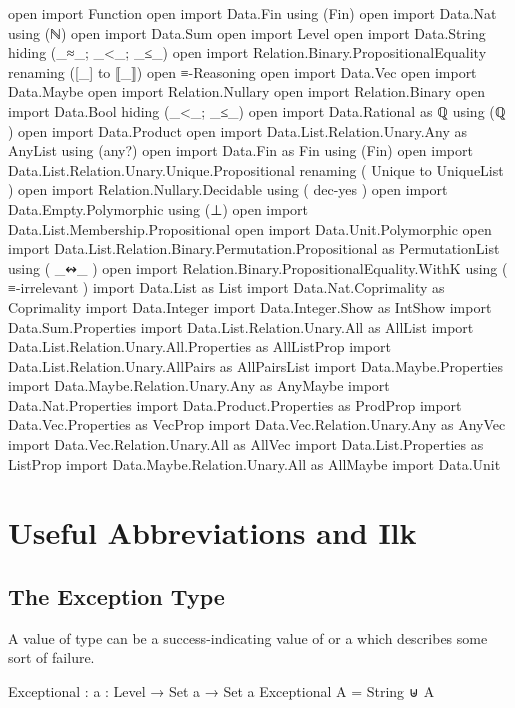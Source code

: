 \documentclass{report}
\begin{document}
\begin{code}
open import Function
open import Data.Fin using (Fin)
open import Data.Nat using (ℕ)
open import Data.Sum
open import Level
open import Data.String hiding (_≈_; _<_; _≤_)
open import Relation.Binary.PropositionalEquality renaming ([_] to ⟦_⟧)
open ≡-Reasoning
open import Data.Vec
open import Data.Maybe
open import Relation.Nullary
open import Relation.Binary
open import Data.Bool hiding (_<_; _≤_)
open import Data.Rational
  as ℚ
  using (ℚ
        )
open import Data.Product
open import Data.List.Relation.Unary.Any as AnyList using (any?)
open import Data.Fin as Fin using (Fin)
open import Data.List.Relation.Unary.Unique.Propositional
  renaming
    ( Unique to UniqueList
    )
open import Relation.Nullary.Decidable
  using
    ( dec-yes
    )
open import Data.Empty.Polymorphic using (⊥)
open import Data.List.Membership.Propositional
open import Data.Unit.Polymorphic
open import Data.List.Relation.Binary.Permutation.Propositional
  as PermutationList
  using
    ( _↭_
    )
open import Relation.Binary.PropositionalEquality.WithK
  using
    ( ≡-irrelevant
    )
import Data.List as List
import Data.Nat.Coprimality as Coprimality
import Data.Integer
import Data.Integer.Show as IntShow
import Data.Sum.Properties
import Data.List.Relation.Unary.All as AllList
import Data.List.Relation.Unary.All.Properties as AllListProp
import Data.List.Relation.Unary.AllPairs as AllPairsList
import Data.Maybe.Properties
import Data.Maybe.Relation.Unary.Any as AnyMaybe
import Data.Nat.Properties
import Data.Product.Properties as ProdProp
import Data.Vec.Properties as VecProp
import Data.Vec.Relation.Unary.Any as AnyVec
import Data.Vec.Relation.Unary.All as AllVec
import Data.List.Properties as ListProp
import Data.Maybe.Relation.Unary.All as AllMaybe
import Data.Unit
\end{code}

\chapter{Useful Abbreviations and Ilk}

\section{The Exception Type}
A value of type   can be a success-indicating value of  or a  which describes some sort of failure.

\begin{code}
Exceptional : {a : Level} → Set a → Set a
Exceptional A = String ⊎ A
\end{code}
\end{document}
